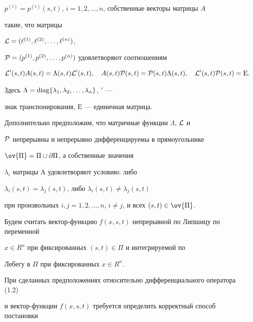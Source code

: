 $p^{(i)}=p^{(i)}(s,t)$, $i=1,2,\dotsc,n$, собственные векторы матрицы $A$ 


такие, что матрицы


${\cal L}=(\ell^{(1)}, \ell^{(2)},\dotsc,\ell^{(n)})$, \linebreak


${\cal P}=(p^{(1)},p^{(2)},\dotsc,p^{(n)})$ удовлетворяют соотношениям


\begin{equation}


{\cal L}^{\prime}(s,t) A(s,t)=\Lambda(s,t) {\cal L}^{\prime}(s,t), 


\quad A(s,t) {\cal P}(s,t)={\cal P}(s,t) \Lambda(s,t), 


\quad {\cal L}^{\prime}(s,t) {\cal P}(s,t)=\mathrm E.


\end{equation}


Здесь $\Lambda=\operatorname{diag} \{\lambda_1, \lambda_2,\dotsc,\lambda_n\}$, $\prime$ ---


знак транспонирования, $\mathrm E$ --- единичная матрица.





Дополнительно предположим, что матричные функции $\Lambda$, ${\cal L}$ и 


$\cal P$ непрерывны и непрерывно дифференцируемы в прямоугольнике 


$\ov {\Pi}={\Pi} \cup \partial {\Pi}$, а собственные значения 


$\lambda_i$ матрицы $\mathrm A$ удовлетворяют условию: либо 


$\lambda_i(s,t)=\lambda_j(s,t)$, либо $\lambda_i(s,t) \neq \lambda_j(s,t)$


при произвольных $i, j=1,2,\dotsc,n$, $i \neq j$, и всех $(s,t) \in \ov{\Pi}$.





Будем считать вектор-функцию $f(x,s,t)$ непрерывной по Липшицу по переменной


$x \in R^n$ при фиксированных $(s,t) \in {\Pi}$ и интегрируемой по 


Лебегу в $\Pi$ при фиксированных $x \in R^n$.





При сделанных предположениях относительно дифференциального оператора (1.2)


и вектор-функции $f(x,s,t)$ требуется определить корректный способ постановки 


